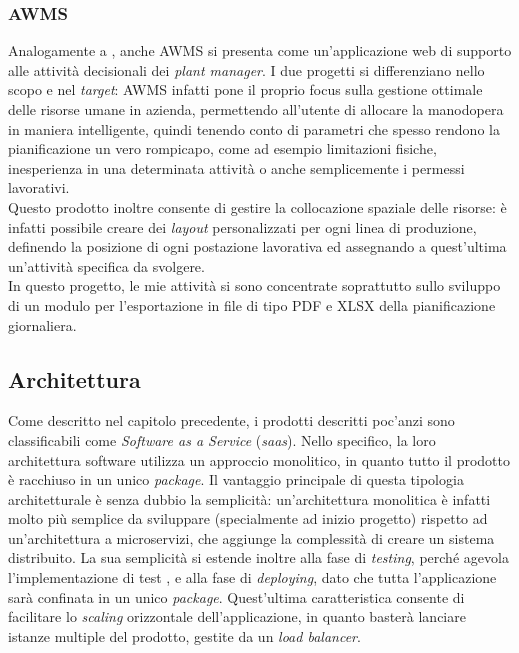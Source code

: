 \subsubsection*{AWMS}
Analogamente a \DS{}, anche AWMS si presenta come un'applicazione web di supporto alle attività decisionali dei \textit{plant manager}. I due progetti si differenziano nello scopo e nel \textit{target}: AWMS infatti pone il proprio focus sulla gestione ottimale delle risorse umane in azienda, permettendo all'utente di allocare la manodopera in maniera intelligente, quindi tenendo conto di parametri che spesso rendono la pianificazione un vero rompicapo, come ad esempio limitazioni fisiche, inesperienza in una determinata attività o anche semplicemente i permessi lavorativi.\\
Questo prodotto inoltre consente di gestire la collocazione spaziale delle risorse: è infatti possibile creare dei \textit{layout} personalizzati per ogni linea di produzione, definendo la posizione di ogni postazione lavorativa ed assegnando a quest'ultima un'attività specifica da svolgere.\\
In questo progetto, le mie attività si sono concentrate soprattutto sullo sviluppo di un modulo per l'esportazione in file di tipo PDF e XLSX della pianificazione giornaliera.
\subsection{Architettura}
\label{subsec:architettura-monolitica}
Come descritto nel capitolo precedente, i prodotti descritti poc'anzi sono classificabili come \textit{Software as a Service} (\textit{\acrshort{saas}}). Nello specifico, la loro architettura software utilizza un approccio monolitico, in quanto tutto il prodotto è racchiuso in un unico \textit{package}. Il vantaggio principale di questa tipologia architetturale è senza dubbio la semplicità: un'architettura monolitica è infatti molto più semplice da sviluppare (specialmente ad inizio progetto) rispetto ad un'architettura a microservizi, che aggiunge la complessità di creare un sistema distribuito. La sua semplicità si estende inoltre alla fase di \textit{testing}, perché agevola l'implementazione di test , e alla fase di \textit{deploying}, dato che tutta l'applicazione sarà confinata in un unico \textit{package}. Quest'ultima caratteristica consente di facilitare lo \textit{scaling} orizzontale dell'applicazione, in quanto basterà lanciare istanze multiple del prodotto, gestite da un \textit{load balancer}.\\

